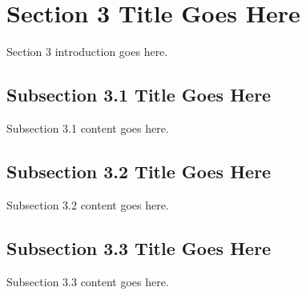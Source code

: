 \section{Section 3 Title Goes Here}\label{sec:3}
Section 3 introduction goes here.

\subsection{Subsection 3.1 Title Goes Here}\label{subsec:3.1}
Subsection 3.1 content goes here.

\subsection{Subsection 3.2 Title Goes Here}\label{subsec:3.2}
Subsection 3.2 content goes here.

\subsection{Subsection 3.3 Title Goes Here}\label{subsec:3.3}
Subsection 3.3 content goes here.
